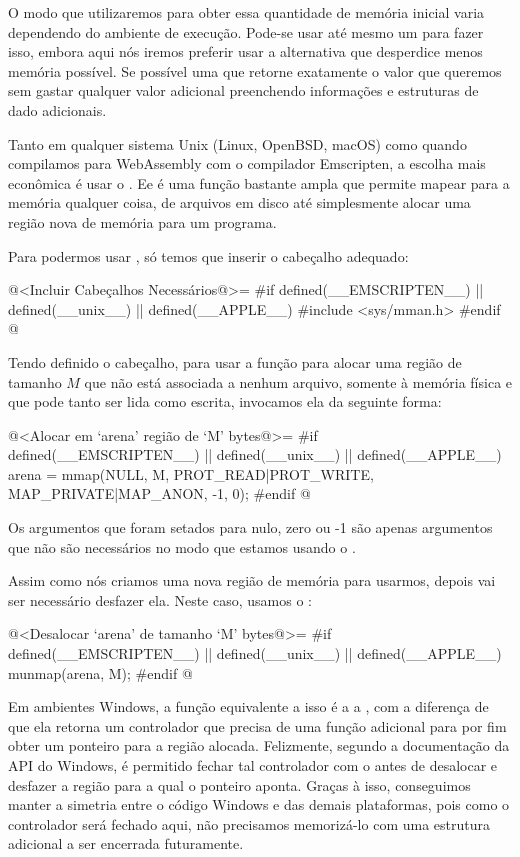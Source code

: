 O modo que utilizaremos para obter essa quantidade de memória inicial
varia dependendo do ambiente de execução. Pode-se usar até mesmo
um  para fazer isso, embora aqui nós iremos
preferir usar a alternativa que desperdice menos memória possível. Se
possível uma que retorne exatamente o valor que queremos sem gastar
qualquer valor adicional preenchendo informações e estruturas de dado
adicionais.

Tanto em qualquer sistema Unix (Linux, OpenBSD, macOS) como quando
compilamos para WebAssembly com o compilador Emscripten, a escolha
mais econômica é usar o . Ee é uma função bastante
ampla que permite mapear para a memória qualquer coisa, de arquivos em
disco até simplesmente alocar uma região nova de memória para um
programa.

Para podermos usar , só temos que inserir o cabeçalho
adequado:

\iniciocodigo
@<Incluir Cabeçalhos Necessários@>=
#if defined(__EMSCRIPTEN__) || defined(__unix__) || defined(__APPLE__)
#include <sys/mman.h>
#endif
@
\fimcodigo

Tendo definido o cabeçalho, para usar a função para alocar uma região
de tamanho $M$ que não está associada a nenhum arquivo, somente à
memória física e que pode tanto ser lida como escrita, invocamos ela
da seguinte forma:

\iniciocodigo
@<Alocar em `arena' região de `M' bytes@>=
#if defined(__EMSCRIPTEN__) || defined(__unix__) || defined(__APPLE__)
arena = mmap(NULL, M, PROT_READ|PROT_WRITE, MAP_PRIVATE|MAP_ANON,
             -1, 0);
#endif
@
\fimcodigo

Os argumentos que foram setados para nulo, zero ou -1 são apenas
argumentos que não são necessários no modo que estamos usando
o .

Assim como nós criamos uma nova região de memória para usarmos, depois
vai ser necessário desfazer ela. Neste caso, usamos
o :

\iniciocodigo
@<Desalocar `arena' de tamanho `M' bytes@>=
#if defined(__EMSCRIPTEN__) || defined(__unix__) || defined(__APPLE__)
munmap(arena, M);
#endif
@
\fimcodigo

Em ambientes Windows, a função equivalente a isso é a
a , com a diferença de que ela retorna
um controlador que precisa de uma função adicional para por fim obter
um ponteiro para a região alocada. Felizmente, segundo a documentação
da API do Windows, é permitido fechar tal controlador com
o  antes de desalocar e desfazer a região
para a qual o ponteiro aponta. Graças à isso, conseguimos manter a
simetria entre o código Windows e das demais plataformas, pois como o
controlador será fechado aqui, não precisamos memorizá-lo com uma
estrutura adicional a ser encerrada futuramente.

